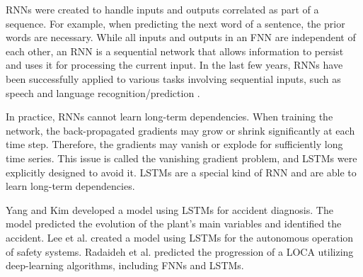 
\Glspl*{RNN} were created to handle inputs and outputs correlated as part of a sequence.
For example, when predicting the next word of a sentence, the prior words are necessary.
While all inputs and outputs in an FNN are independent of each other, an RNN is a sequential network that allows information to persist and uses it for processing the current input.
In the last few years, \glspl*{RNN} have been successfully applied to various tasks involving sequential inputs, such as speech and language recognition/prediction \cite{mikolov_recurrent_2010}.

In practice, RNNs cannot learn long-term dependencies.
When training the network, the back-propagated gradients may grow or shrink significantly at each time step.
Therefore, the gradients may vanish or explode for sufficiently long time series.
This issue is called the vanishing gradient problem, and \glspl*{LSTM} were explicitly designed to avoid it.
LSTMs are a special kind of RNN and are able to learn long-term dependencies.

Yang and Kim \cite{yang_accident_2018} developed a model using LSTMs for accident diagnosis.
The model predicted the evolution of the plant's main variables and identified the accident.
Lee et al. \cite{lee_autonomous_2018} created a model using LSTMs for the autonomous operation of safety systems.
Radaideh et al. \cite{radaideh_neural-based_2020} predicted the progression of a \gls*{LOCA} utilizing deep-learning algorithms, including FNNs and LSTMs.

